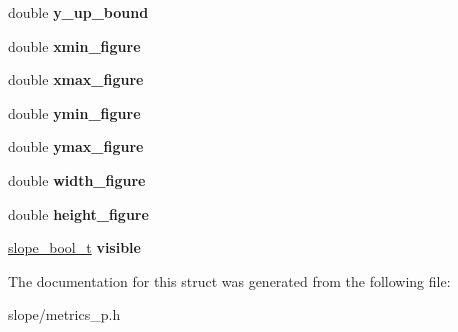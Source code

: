 \begin{DoxyCompactItemize}
\item 
\hypertarget{struct__slope__metrics_a7586b1c1f9cd7f80e929d3818534a20c}{double {\bfseries y\+\_\+up\+\_\+bound}}\label{struct__slope__metrics_a7586b1c1f9cd7f80e929d3818534a20c}

\item 
\hypertarget{struct__slope__metrics_a435925cdf5bd35658acfb48dcd707b66}{double {\bfseries xmin\+\_\+figure}}\label{struct__slope__metrics_a435925cdf5bd35658acfb48dcd707b66}

\item 
\hypertarget{struct__slope__metrics_ae5a8b9e2c17313f5e8df3ba3a3d29fd2}{double {\bfseries xmax\+\_\+figure}}\label{struct__slope__metrics_ae5a8b9e2c17313f5e8df3ba3a3d29fd2}

\item 
\hypertarget{struct__slope__metrics_a6000828f5bc6d9c83d66aa7899ff36dc}{double {\bfseries ymin\+\_\+figure}}\label{struct__slope__metrics_a6000828f5bc6d9c83d66aa7899ff36dc}

\item 
\hypertarget{struct__slope__metrics_a7351a93e448f8dd9441d9319fd984ac7}{double {\bfseries ymax\+\_\+figure}}\label{struct__slope__metrics_a7351a93e448f8dd9441d9319fd984ac7}

\item 
\hypertarget{struct__slope__metrics_a6c276a074789c36f794b053afc0e7267}{double {\bfseries width\+\_\+figure}}\label{struct__slope__metrics_a6c276a074789c36f794b053afc0e7267}

\item 
\hypertarget{struct__slope__metrics_a2251d1d4ddf5113421470ee169821d0b}{double {\bfseries height\+\_\+figure}}\label{struct__slope__metrics_a2251d1d4ddf5113421470ee169821d0b}

\item 
\hypertarget{struct__slope__metrics_a28f142398e73765dbe70894078487c79}{\hyperlink{group__Primitives_gac55afa016ca777119a6c343d1655d558}{slope\+\_\+bool\+\_\+t} {\bfseries visible}}\label{struct__slope__metrics_a28f142398e73765dbe70894078487c79}

\end{DoxyCompactItemize}


The documentation for this struct was generated from the following file\+:\begin{DoxyCompactItemize}
\item 
slope/metrics\+\_\+p.\+h\end{DoxyCompactItemize}

